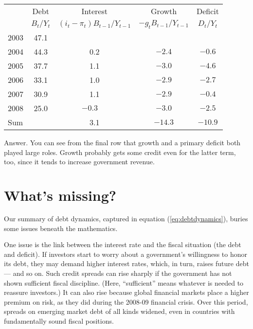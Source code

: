 \begin{center}
\begin{tabular*}{\textwidth}{lcccc}
\toprule
        & Debt   & Interest &  Growth
            & \phantom{x}Deficit\phantom{x} \\
        &  $B_{t}/Y_{t}$ &  $(i_t-\pi_t)B_{t-1}/Y_{t-1}$  &  $-g_t B_{t-1}/Y_{t-1}$
                & $D_t/Y_t$ \\
\midrule
2003\phantom{xxxx}
            & 47.1 &  \\
2004        & 44.3 & 0.2 & $-2.4$ & $-0.6$  \\
2005        & 37.7 & 1.1 & $-3.0$ & $-4.6$  \\
2006        & 33.1 & 1.0 & $-2.9$ & $-2.7$  \\
2007        & 30.9 & 1.1 & $-2.9$ & $-0.4$  \\
2008        & 25.0 & $-0.3\phantom{-}$ & $-3.0$ & $-2.5$ \\
\midrule
Sum         &      & 3.1 & $-14.3$ & $-10.9$ \\
\bottomrule
\end{tabular*}
\end{center}

Answer.  You can see from the final row that
growth and a primary deficit both played large roles.
Growth probably gets some credit even for the latter term, too,
since it tends to increase government revenue.



\section{What's missing?}

Our summary of debt dynamics,
captured in equation (\ref{eq:debtdynamics}), buries some issues beneath the mathematics.

One issue is the link between the interest rate
and the fiscal situation (the debt and deficit).
If investors start to worry about a government's
willingness to honor its debt,
they may demand higher interest rates,
which, in turn, raises future debt --- and so on.
Such credit spreads can rise sharply
if the government has not shown sufficient
fiscal discipline.
(Here, ``sufficient'' means whatever is needed to reassure
investors.)
It can also rise because global financial markets
place a higher premium on risk,
as they did during the 2008-09 financial crisis.
Over this period, spreads on emerging market debt of all kinds
widened, even in countries with fundamentally sound
fiscal positions.

